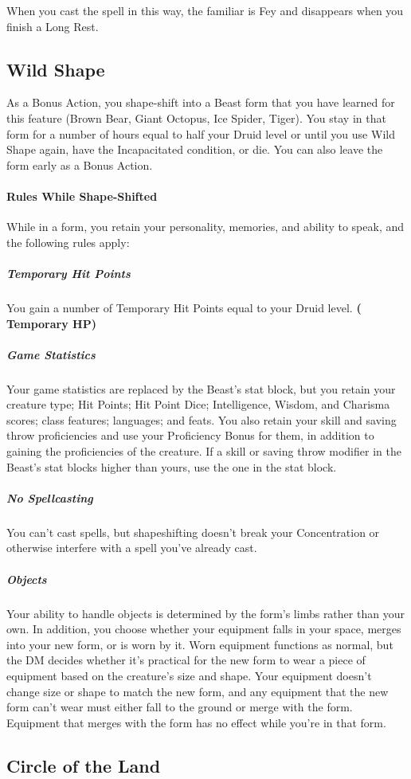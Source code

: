 \documentclass[letterpaper,openany,oneside,twocolumn]{book}
\begin{document}
When you cast the spell in this way, the familiar is Fey and disappears when you finish a Long Rest.

\subsection*{Wild Shape}
As a Bonus Action, you shape-shift into a Beast form that you have learned for this feature (Brown Bear, Giant Octopus, Ice Spider, Tiger). You stay in that form for a number of hours equal to half your Druid level or until you use Wild Shape again, have the Incapacitated condition, or die. You can also leave the form early as a Bonus Action.
\paragraph*{Rules While Shape-Shifted} While in a form, you retain your personality, memories, and ability to speak, and the following rules apply:
\subparagraph*{Temporary Hit Points} You gain a number of Temporary Hit Points equal to your Druid level. \textbf{( Temporary HP)}
\subparagraph*{Game Statistics} Your game statistics are replaced by the Beast's stat block, but you retain your creature type; Hit Points; Hit Point Dice; Intelligence, Wisdom, and Charisma scores; class features; languages; and feats. You also retain your skill and saving throw proficiencies and use your Proficiency Bonus for them, in addition to gaining the proficiencies of the creature. If a skill or saving throw modifier in the Beast's stat blocks higher than yours, use the one in the stat block.
\subparagraph*{No Spellcasting} You can't cast spells, but shapeshifting doesn't break your Concentration or otherwise interfere with a spell you've already cast.
\subparagraph*{Objects} Your ability to handle objects is determined by the form's limbs rather than your own. In addition, you choose whether your equipment falls in your space, merges into your new form, or is worn by it. Worn equipment functions as normal, but the DM decides whether it's practical for the new form to wear a piece of equipment based on the creature's size and shape. Your equipment doesn't change size or shape to match the new form, and any equipment that the new form can't wear must either fall to the ground or merge with the form. Equipment that merges with the form has no effect while you're in that form.

\subsection*{Circle of the Land}
\end{document}
